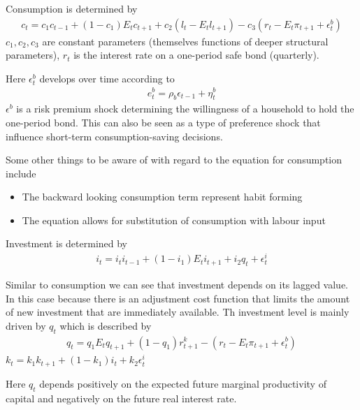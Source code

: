 \documentclass{beamer}
\begin{document}
\begin{frame}
  Consumption is determined by
\begin{align*}
  c_t = c_1c_{t-1} + (1-c_1) E_t c_{t+1} + c_2(l_t-E_t l_{t+1}) - c_3(r_t - E_t \pi_{t+1} + \epsilon_t^b)
\end{align*}
$c_1, c_2, c_3$ are constant parameters (themselves functions of deeper structural parameters), $r_t$ is the interest rate on a one-period safe bond (quarterly).

Here $\epsilon_t^b$ develops over time according to
\begin{align*}
  e_t^b = \rho_b\epsilon_{t-1} + \eta_t^b
\end{align*}
$\epsilon^b$ is a risk premium shock determining the willingness of a household to hold the one-period bond. This can also be seen as a type of preference shock that influence short-term consumption-saving decisions.

\end{frame}

\begin{frame}
  Some other things to be aware of with regard to the equation for consumption include
\begin{itemize}
  \item The backward looking consumption term represent habit forming
  \item The equation allows for substitution of consumption with labour input
\end{itemize}

\end{frame}

\begin{frame}
  Investment is determined by
\begin{align*}
  i_t = i_ti_{t-1} + (1-i_1)E_ti_{t+1} + i_2q_t + \epsilon_t^i
\end{align*}

Similar to consumption we can see that investment depends on its lagged value. 
In this case because there is an adjustment cost function that limits the amount of new investment that are immediately available. 
Th investment level is mainly driven by $q_t$ which is described by 
\begin{align*}
  q_t = q_1E_tq_{t+1} + (1-q_1)r_{t+1}^k - (r_t - E_t\pi_{t+1} + \epsilon_t^b)
\end{align*}
$k_t = k_1k_{t+1} + (1-k_1)i_t + k_2\epsilon_t^i$

Here $q_t$ depends positively on the expected future marginal productivity of capital and negatively on the future real interest rate. 

\end{frame}
\end{document}
